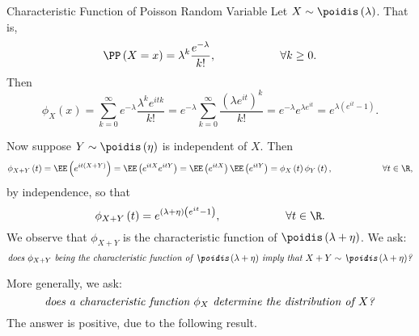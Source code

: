 \documentclass[stat901]{subfiles}
\begin{document}
    \rruleline

    \begin{example}{Characteristic Function of Poisson Random Variable}
        Let $X\sim\poidis\left( \lambda \right)$. That is,
        \begin{equation*}
            \PP\left( X=x \right) = \lambda^k \frac{e^{-\lambda}}{k!}, \hspace{2cm}\forall k\geq 0.
        \end{equation*}
        Then
        \begin{equation*}
            \phi_X\left( x \right) = \sum^{\infty}_{k=0} e^{-\lambda} \frac{\lambda^ke^{itk}}{k!} = e^{-\lambda} \sum^{\infty}_{k=0} \frac{\left( \lambda e^{it} \right)^k}{k!} = e^{-\lambda} e^{\lambda e^{it}} = e^{\lambda\left( e^{it}-1 \right)}.
        \end{equation*}

        Now suppose $Y\sim\poidis\left( \eta \right)$ is independent of $X$. Then
        \begin{equation*}
            \phi_{X+Y}\left( t \right) = \EE\left( e^{it\left( X+Y \right)} \right) = \EE\left( e^{itX}e^{itY} \right) = \EE\left( e^{itX} \right)\EE\left( e^{itY} \right) = \phi_X\left( t \right)\phi_Y\left( t \right), \hspace{2cm}\forall t\in\R,
        \end{equation*}
        by independence, so that
        \begin{equation*}
            \phi_{X+Y}\left( t \right) = e^{\left( \lambda+\eta \right)\left( e^{it}-1 \right)}, \hspace{2cm}\forall t\in\R.
        \end{equation*}
        We observe that $\phi_{X+Y}$ is the characteristic function of $\poidis\left( \lambda+\eta \right)$. We ask:
        \begin{equation*}
            \text{\textit{does $\phi_{X+Y}$ being the characteristic function of $\poidis\left( \lambda+\eta \right)$ imply that $X+Y\sim\poidis\left( \lambda+\eta \right)$?}}
        \end{equation*}
    \end{example}

    \rruleline

    \np More generally, we ask:
    \begin{equation*}
        \text{\textit{does a characteristic function $\phi_X$ determine the distribution of $X$?}}
    \end{equation*}
    The answer is positive, due to the following result.
\end{document}
